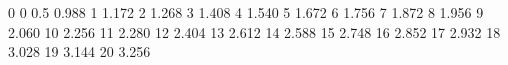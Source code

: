 0 0
0.5 0.988
1 1.172
2 1.268
3 1.408
4 1.540
5 1.672
6 1.756
7 1.872
8 1.956
9 2.060
10 2.256
11 2.280
12 2.404
13 2.612
14 2.588
15 2.748
16 2.852
17 2.932
18 3.028
19 3.144
20 3.256
